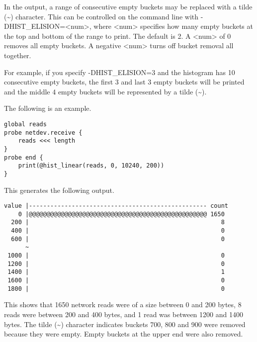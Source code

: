 \documentclass[twoside,english]{article}
\newenvironment{vindent}
{\begin{list}{}{\setlength{\listparindent}{6pt}}
\item[]}
{\end{list}}
\begin{document}
In the output, a range of consecutive empty buckets may be replaced with a tilde
(\textasciitilde{}) character.  This can be controlled on the command line
with -DHIST\_ELISION=\textless\hspace{1 sp}num\textgreater\hspace{1 sp},
where \textless\hspace{1 sp}num\textgreater\hspace{1 sp} specifies how many
empty buckets at the top and bottom of the range to print.
The default is 2.  A \textless\hspace{1 sp}num\textgreater\hspace{1 sp} of 0
removes all empty buckets. A negative \textless\hspace{1 sp}num\textgreater\hspace{1 sp}
turns off bucket removal all together.

For example, if you specify -DHIST\_ELISION=3 and the histogram has 10
consecutive empty buckets, the first 3 and last 3 empty buckets will
be printed and the middle 4 empty buckets will be represented by a
tilde (\textasciitilde{}).

The following is an example.

\begin{vindent}
\begin{verbatim}
global reads
probe netdev.receive {
    reads <<< length
}
probe end {
    print(@hist_linear(reads, 0, 10240, 200))
}
\end{verbatim}
\end{vindent}
This generates the following output.

\pagebreak
\begin{vindent}
\begin{verbatim}
value |-------------------------------------------------- count
    0 |@@@@@@@@@@@@@@@@@@@@@@@@@@@@@@@@@@@@@@@@@@@@@@@@@@ 1650
  200 |                                                      8
  400 |                                                      0
  600 |                                                      0
      ~
 1000 |                                                      0
 1200 |                                                      0
 1400 |                                                      1
 1600 |                                                      0
 1800 |                                                      0
\end{verbatim}
\end{vindent}
This shows that 1650 network reads were of a size between 0 and 200 bytes,
8 reads were between 200 and 400 bytes, and 1 read was between
1200 and 1400 bytes.  The tilde (\textasciitilde{}) character indicates
buckets 700, 800 and 900 were removed because they were empty.
Empty buckets at the upper end were also removed.
\end{document}
